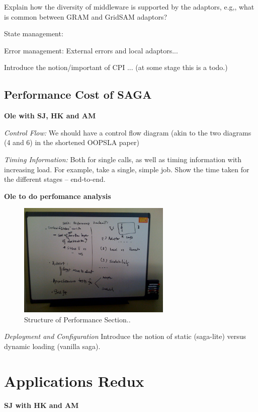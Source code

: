 \documentclass[10pt,letterpaper]{article}
\newcommand{\up}{\vspace*{-0.25em}}
\begin{document}
Explain how the diversity of middleware is supported by the adaptors,
e.g,, what is common between GRAM and GridSAM adaptors?

State management:

Error management: External errors and local adaptors...

Introduce the notion/important of CPI ... (at some stage this is a
todo.)

\subsection{Performance Cost of SAGA}{\bf Ole with SJ,
  HK and AM}

{\it Control Flow:} We should have a control flow diagram (akin to the
two diagrams (4 and 6) in the shortened OOPSLA paper)


{\it Timing Information:} Both for single calls, as well as timing
information with increasing load.  For example, take a single, simple
job. Show the time taken for the different stages -- end-to-end.

{\bf Ole to do perfomance analysis}


\begin{figure}[!ht]
  \up\up
  \begin{center}
      \includegraphics[width=0.65\textwidth]{../figures/ole_board-01.jpg}
 \end{center}
  \up\up\up\up\up\up\up\up\up\up
  \caption{\small Structure of Performance Section..}
 \label{stuff..}
\end{figure}


{\it Deployment and Configuration} Introduce the notion of static
(saga-lite) versus dynamic loading (vanilla saga).

\section{Applications Redux}{\bf SJ with HK and AM}
\end{document}
